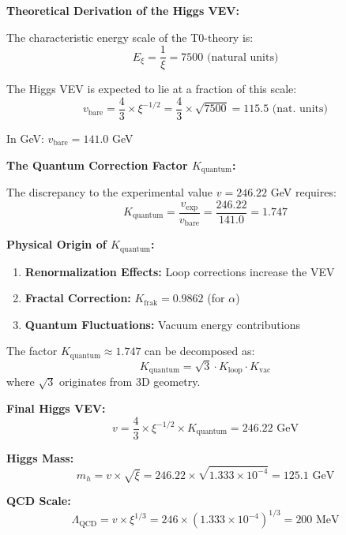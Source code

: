 \documentclass[12pt,a4paper]{article}
\newcommand{\xipar}{\xi}
\newcommand{\Kquantum}{K_{\text{quantum}}}
\begin{document}
	\begin{keyresult}
		\textbf{Theoretical Derivation of the Higgs VEV:}
		
		The characteristic energy scale of the T0-theory is:
		\begin{equation}
			E_\xipar = \frac{1}{\xipar} = 7500 \text{ (natural units)}
		\end{equation}
		
		The Higgs VEV is expected to lie at a fraction of this scale:
		\begin{equation}
			v_{\text{bare}} = \frac{4}{3} \times \xipar^{-1/2} = \frac{4}{3} \times \sqrt{7500} = 115.5 \text{ (nat. units)}
		\end{equation}
		
		In GeV: $v_{\text{bare}} = 141.0$ GeV
		
		\textbf{The Quantum Correction Factor $\Kquantum$:}
		
		The discrepancy to the experimental value $v = 246.22$ GeV requires:
		\begin{equation}
			\Kquantum = \frac{v_{\text{exp}}}{v_{\text{bare}}} = \frac{246.22}{141.0} = 1.747
		\end{equation}
		
		\textbf{Physical Origin of $\Kquantum$:}
		\begin{enumerate}
			\item \textbf{Renormalization Effects:} Loop corrections increase the VEV
			\item \textbf{Fractal Correction:} $K_{\text{frak}} = 0.9862$ (for $\alpha$)
			\item \textbf{Quantum Fluctuations:} Vacuum energy contributions
		\end{enumerate}
		
		The factor $\Kquantum \approx 1.747$ can be decomposed as:
		\begin{equation}
			\Kquantum = \sqrt{3} \cdot K_{\text{loop}} \cdot K_{\text{vac}}
		\end{equation}
		where $\sqrt{3}$ originates from 3D geometry.
	\end{keyresult}
	
	\begin{secondary}
		\textbf{Final Higgs VEV:}
		\begin{equation}
			\boxed{v = \frac{4}{3} \times \xipar^{-1/2} \times \Kquantum = 246.22 \text{ GeV}}
		\end{equation}
		
		\textbf{Higgs Mass:}
		\begin{equation}
			m_h = v \times \sqrt{\xipar} = 246.22 \times \sqrt{1.333 \times 10^{-4}} = 125.1 \text{ GeV}
		\end{equation}
		
		\textbf{QCD Scale:}
		\begin{equation}
			\Lambda_{\text{QCD}} = v \times \xipar^{1/3} = 246 \times (1.333 \times 10^{-4})^{1/3} = 200 \text{ MeV}
		\end{equation}
	\end{secondary}
	
\end{document}
